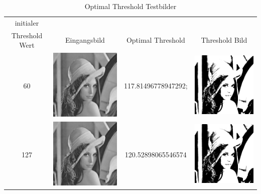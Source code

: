 \documentclass[12pt,german]{article}
\begin{document}
\begin{table}[H]
  \centering
  \begin{tabular}{| c | c | c | c | }
    \hline
   initialer \\Threshold Wert & Eingangsbild & Optimal Threshold & Threshold Bild \\
    \hline
     60 & \includegraphics[width=5cm]{../Bilddaten/3_lena.png} &  117.81496778947292; & \includegraphics[width=5cm]{../Bilddaten/threshold_image-01.png}\\
\hline
 127 & \includegraphics[width=5cm]{../Bilddaten/3_lena.png} &    120.52898065546574  & \includegraphics[width=5cm]{../Bilddaten/threshold_image-02.png} \\
\hline
     
  \end{tabular}
  \caption{Optimal Threshold Testbilder}
\end{table}
\end{document}
